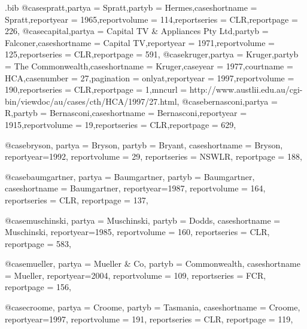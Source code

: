 \begin{filecontents*}[overwrite]{\jobname.bib}
@case{spratt,partya =  {Spratt},partyb =  {Hermes},caseshortname =  {Spratt},reportyear =  {1965},reportvolume =  {114},reportseries =  {CLR},reportpage =  {226},}
@case{capital,partya =  {Capital TV \& Appliances Pty Ltd},partyb =  {Falconer},caseshortname =  {Capital TV},reportyear =  {1971},reportvolume =  {125},reportseries =  {CLR},reportpage =  {591},}
@case{kruger,partya =  {Kruger},partyb =  {The Commonwealth},caseshortname =  {Kruger},caseyear =  {1977},courtname =  {HCA},casenumber =  {27},pagination =  {onlyat},reportyear =  {1997},reportvolume =  {190},reportseries =  {CLR},reportpage =  {1},mncurl =  {http://www.austlii.edu.au/cgi-bin/viewdoc/au/cases/cth/HCA/1997/27.html},}
@case{bernasconi,partya =  {R},partyb =  {Bernasconi},caseshortname =  {Bernasconi},reportyear =  {1915},reportvolume =  {19},reportseries =  {CLR},reportpage =  {629},}


@case{bryson,
  partya = {Bryson}, 
  partyb = {Bryant},
  caseshortname = {Bryson},
  reportyear={1992},
  reportvolume = {29},
  reportseries = {NSWLR},
  reportpage = {188},
}





@case{baumgartner,
  partya = {Baumgartner}, 
  partyb = {Baumgartner},
  caseshortname = {Baumgartner},
  reportyear={1987},
  reportvolume = {164},
  reportseries = {CLR},
  reportpage = {137},
}




@case{muschinski,
  partya = {Muschinski}, 
  partyb = {Dodds},
  caseshortname = {Muschinski},
  reportyear={1985},
  reportvolume = {160},
  reportseries = {CLR},
  reportpage = {583},
}


@case{mueller,
  partya = {Mueller \& Co}, 
  partyb = {Commonwealth},
  caseshortname = {Mueller},
  reportyear={2004},
  reportvolume = {109},
  reportseries = {FCR},
  reportpage = {156},
}


@case{croome,
  partya = {Croome}, 
  partyb = {Tasmania},
  caseshortname = {Croome},
  reportyear={1997},
  reportvolume = {191},
  reportseries = {CLR},
  reportpage = {119},
}




\end{filecontents*}
